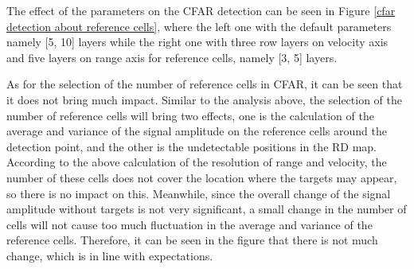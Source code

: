 \documentclass[12pt,DIV14,BCOR12mm,a4paper,footinclude=false,headinclude,parskip=half-,twoside,openright,cleardoublepage=empty,toc=index,bibliography=totoc,listof=totoc]{scrreprt}
\numberwithin{equation}{chapter}
\begin{document}
The effect of the parameters on the CFAR detection can be seen in Figure \ref{cfar detection about reference cells}, where the left one with the default parameters namely [5, 10] layers while the right one with three row layers on velocity axis and five layers on range axis for reference cells, namely [3, 5] layers.

As for the selection of the number of reference cells in CFAR, it can be seen that it does not bring much impact. Similar to the analysis above, the selection of the number of reference cells will bring two effects, one is the calculation of the average and variance of the signal amplitude on the reference cells around the detection point, and the other is the undetectable positions in the RD map. According to the above calculation of the resolution of range and velocity, the number of these cells does not cover the location where the targets may appear, so there is no impact on this. Meanwhile, since the overall change of the signal amplitude without targets is not very significant, a small change in the number of cells will not cause too much fluctuation in the average and variance of the reference cells. Therefore, it can be seen in the figure that there is not much change, which is in line with expectations.
\end{document}

